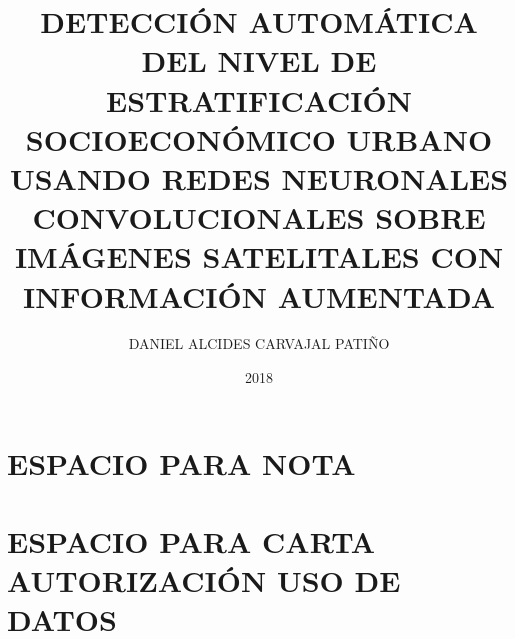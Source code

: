 

\usepackage{longtable} %
\usepackage{booktabs} %
\usepackage[spanish]{babel} %
\usepackage[T1]{fontenc}
\usepackage[utf8]{inputenc}
\usepackage{lipsum}
\usepackage{CJKutf8}

\usepackage{hyperref}
\expandafter\def\expandafter\UrlBreaks\expandafter{\UrlBreaks%
	\do\a\do\b\do\c\do\d\do\e\do\f\do\g\do\h\do\i\do\j%
	\do\k\do\l\do\m\do\n\do\o\do\p\do\q\do\r\do\s\do\t%
	\do\u\do\v\do\w\do\x\do\y\do\z\do\A\do\B\do\C\do\D%
	\do\E\do\F\do\G\do\H\do\I\do\J\do\K\do\L\do\M\do\N%
	\do\O\do\P\do\Q\do\R\do\S\do\T\do\U\do\V\do\W\do\X%
	\do\Y\do\Z\do\*\do\-\do\~\do\'\do\"\do\-}%


\title{DETECCIÓN AUTOMÁTICA DEL NIVEL DE ESTRATIFICACIÓN SOCIOECONÓMICO URBANO USANDO REDES NEURONALES CONVOLUCIONALES SOBRE IMÁGENES SATELITALES CON INFORMACIÓN AUMENTADA}
\author{DANIEL ALCIDES CARVAJAL PATIÑO}

\date{2018}






	\onehalfspace
	\maketitle
	\chapter*{ESPACIO PARA NOTA}
    \newpage
    \chapter*{ESPACIO PARA CARTA AUTORIZACIÓN USO DE DATOS}
    \newpage
	\tableofcontents
	\newpage \listoffigures
	\newpage \listoftables

